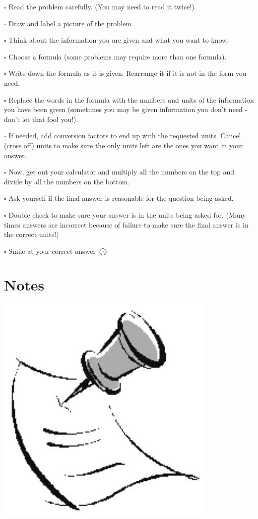 \documentclass[10pt]{article}
\begin{document}
$\square$ Read the problem carefully. (You may need to read it twice!)

$\square$ Draw and label a picture of the problem.

$\square$ Think about the information you are given and what you want to know.

$\square$ Choose a formula (some problems may require more than one formula).

$\square$ Write down the formula as it is given. Rearrange it if it is not in the form you need.

$\square$ Replace the words in the formula with the numbers and units of the information you have been given (sometimes you may be given information you don't need - don't let that fool you!).

$\square$ If needed, add conversion factors to end up with the requested units. Cancel (cross off) units to make sure the only units left are the ones you want in your answer.

$\square$ Now, get out your calculator and multiply all the numbers on the top and divide by all the numbers on the bottom.

$\square$ Ask yourself if the final answer is reasonable for the question being asked.

$\square$ Double check to make sure your answer is in the units being asked for. (Many times answers are incorrect because of failure to make sure the final answer is in the correct units!)

$\square$ Smile at your correct answer $\bigodot$

\section{Notes}
\includegraphics[max width=\textwidth]{2022_09_16_4d34b76b97ee13a67df7g-14}
\end{document}
